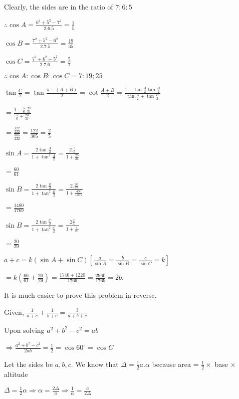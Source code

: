 \item Clearly, the sides are in the ratio of $7:6:5$

  $\therefore \cos A = \frac{6^2 + 5^2 - 7^2}{2.6.5} = \frac{1}{5}$

  $\cos B = \frac{7^2 + 5^2 - 6^2}{2.7.5} = \frac{19}{35}$

  $\cos C = \frac{7^2 + 6^2 - 5^2}{2.7.6} = \frac{5}{7}$

  $\therefore \cos A:\cos B:\cos C = 7:19;25$

\item $\tan \frac{C}{2} = \tan\frac{\pi - (A + B)}{2} = \cot\frac{A + B}{2} = \frac{1 -
  \tan\frac{A}{2}\tan\frac{B}{2}}{\tan\frac{A}{2} + \tan\frac{B}{2}}$

  $= \frac{1 - \frac{5}{6}.\frac{20}{37}}{\frac{5}{6} + \frac{20}{37}}$

  $= \frac{\frac{122}{222}}{\frac{305}{222}} = \frac{122}{305} = \frac{2}{5}$

  $\sin A = \frac{2\tan\frac{A}{2}}{1 + \tan^2\frac{A}{2}} = \frac{2.\frac{5}{6}}{1 + \frac{25}{36}}$

  $= \frac{60}{61}$

  $\sin B = \frac{2\tan\frac{B}{2}}{1 + \tan^2\frac{B}{2}} = \frac{2.\frac{20}{37}}{1 + \frac{400}{1369}}$

  $= \frac{1480}{1769}$

  $\sin B = \frac{2\tan\frac{C}{2}}{1 + \tan^2\frac{C}{2}} = \frac{2\frac{2}{5}}{1 + \frac{4}{25}}$

  $= \frac{20}{29}$

  $a + c = k(\sin A + \sin C)[\frac{a}{\sin A} = \frac{b}{\sin B} = \frac{c}{\sin C} = k]$

  $= k\left(\frac{60}{61} + \frac{20}{29}\right) = \frac{1740 + 1220}{1769} = \frac{2960}{1769} = 2b.$

\item It is much easier to prove this problem in reverse.

  Given, $\frac{1}{a + c} + \frac{1}{b + c} = \frac{3}{a + b + c}$

  Upon solving $a^2 + b^2 - c^2 = ab$

  $\Rightarrow \frac{a^2 + b^2 - c^2}{2ab} = \frac{1}{2} = \cos60^\circ = \cos C$

\item Let the sides be $a, b, c.$ We know that $\Delta = \frac{1}{2}a.\alpha$ because area = $\frac{1}{2}\times$ base $\times$ altitude

  $\Delta = \frac{1}{2}\alpha \Rightarrow \alpha = \frac{2\Delta}{a} \Rightarrow \frac{1}{\alpha} = \frac{a}{2\Delta}$

